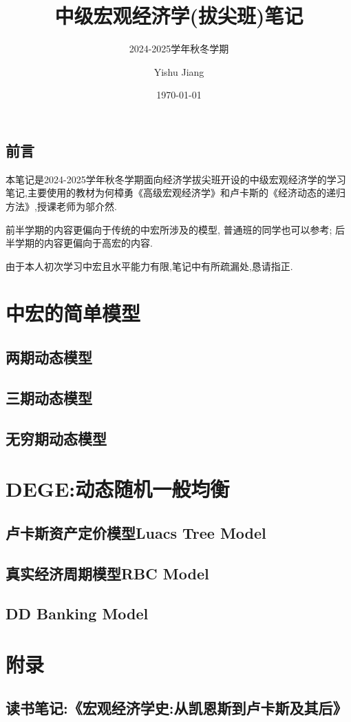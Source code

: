\documentclass[lang=cn,10pt]{elegantbook}
\title{中级宏观经济学(拔尖班)笔记}
\subtitle{2024-2025学年秋冬学期}
\author{Yishu Jiang}
\institute{School of Economics,Zhejiang University}
\date{\today}
\begin{document}
\maketitle
\frontmatter
\chapter*{前言}
{\fangsong 
    本笔记是2024-2025学年秋冬学期面向经济学拔尖班开设的中级宏观经济学的学习笔记,主要使用的教材为何樟勇《高级宏观经济学》和卢卡斯的《经济动态的递归方法》,授课老师为邬介然.
    
    前半学期的内容更偏向于传统的中宏所涉及的模型, 普通班的同学也可以参考; 后半学期的内容更偏向于高宏的内容.

    由于本人初次学习中宏且水平能力有限,笔记中有所疏漏处,恳请指正.
}
\newpage

\tableofcontents

\mainmatter
\part{中宏的简单模型}

\chapter{两期动态模型}
\newpage

\chapter{三期动态模型}
\newpage

\chapter{无穷期动态模型}
\newpage

\part{DEGE:动态随机一般均衡}

\chapter{卢卡斯资产定价模型Luacs Tree Model}
\newpage
\chapter{真实经济周期模型RBC Model}
\newpage
\chapter{DD Banking Model}
\newpage
\part{附录}
\chapter{读书笔记:《宏观经济学史:从凯恩斯到卢卡斯及其后》}
\end{document}
